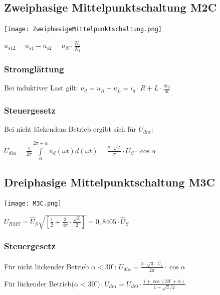 \documentclass[german]{latex4ei/latex4ei_sheet}
\begin{document}
\begin{sectionbox}
		\subsection{Zweiphasige Mittelpunktschaltung M2C}
			\texttt{[image: ZweiphasigeMittelpunktschaltung.png]}

			$u_{s12} = u_{s1}-u_{s2} = u_N \cdot \frac{N_2}{N_1}$
			\subsubsection{Stromglättung}
				Bei induktiver Last gilt: $u_d = u_R + u_L = i_d\cdot R+L\cdot \frac{di_d}{dt}$
			\subsubsection{Steuergesetz}
				Bei nicht lückendem Betrieb ergibt sich für $U_{di\alpha}$:

				$U_{di\alpha} = \frac{1}{2\pi}\int\limits_\alpha^{2\pi+\alpha}u_d(\omega t)d(\omega  t) = \frac{2\cdot \sqrt{2}}{\pi}\cdot U_S \cdot \cos \alpha$
		\subsection{Dreiphasige Mittelpunktschaltung M3C}
			\texttt{[image: M3C.png]}

			$U_{RMS} = \hat{U}_S \sqrt{\left[ \frac{1}{2}+\frac{3}{4\pi}\cdot \frac{\sqrt{3}}{2}\right]} = 0,8405\cdot \hat{U}_S$
			\subsubsection{Steuergesetz}
			Für nicht lückender Betrieb $\alpha < 30^\circ$: $U_{di\alpha} = \frac{3\cdot \sqrt{3}\cdot \hat{U_s}}{2\pi}\cdot \cos \alpha$

			Für lückender Betrieb($\alpha < 30^\circ$): $U_{di\alpha} = U_{di0}\cdot \frac{1+\cos(30^\circ + \alpha)}{1+\sqrt{3}/2}$

	\end{sectionbox}
\end{document}
